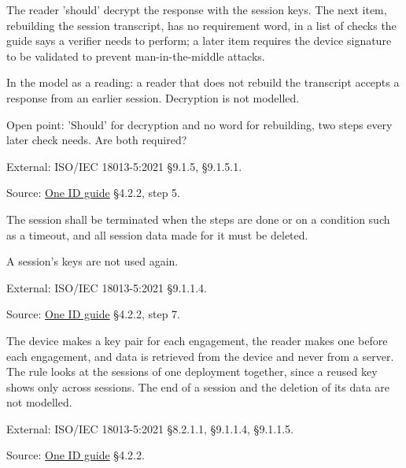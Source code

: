 \begin{definition}
  \label{def:c88}
  \notready
  The reader 'should' decrypt the response with the session keys.  The next
  item, rebuilding the session transcript, has no requirement word, in a list
  of checks the guide says a verifier needs to perform; a later item requires
  the device signature to be validated to prevent man-in-the-middle attacks.

  In the model as a reading: a reader that does not rebuild the transcript
  accepts a response from an earlier session.  Decryption is not modelled.

  Open point: 'Should' for decryption and no word for rebuilding, two steps
  every later check needs.  Are both required?

  External: ISO/IEC 18013-5:2021 §9.1.5, §9.1.5.1.

  Source:
  \href{https://standards.atlassian.net/wiki/spaces/OneID/pages/2947416082/Technical+Implementation+Guide}{One
  ID guide} §4.2.2, step 5.
\end{definition}

\begin{definition}
  \label{def:c91}
  The session shall be terminated when the steps are done or on a condition
  such as a timeout, and all session data made for it must be deleted.

  A session's keys are not used again.

  External: ISO/IEC 18013-5:2021 §9.1.1.4.

  Source:
  \href{https://standards.atlassian.net/wiki/spaces/OneID/pages/2947416082/Technical+Implementation+Guide}{One
  ID guide} §4.2.2, step 7.
\end{definition}


\begin{definition}
  \label{def:proximity-session}
  The device makes a key pair for each engagement, the reader makes one before
  each engagement, and data is retrieved from the device and never from a
  server.  The rule looks at the sessions of one deployment together, since a
  reused key shows only across sessions.  The end of a session and the
  deletion of its data are not modelled.

  External: ISO/IEC 18013-5:2021 §8.2.1.1, §9.1.1.4, §9.1.1.5.

  Source: \href{https://standards.atlassian.net/wiki/spaces/OneID/pages/2947416082/Technical+Implementation+Guide}{One ID guide} §4.2.2.
\end{definition}

